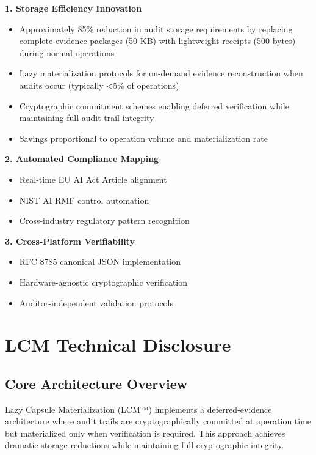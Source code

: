 \documentclass[12pt,a4paper]{article}
\begin{document}
\begin{valuebox}
\textbf{1. Storage Efficiency Innovation}
\begin{itemize}
\item Approximately 85\% reduction in audit storage requirements by replacing complete evidence packages (50 KB) with lightweight receipts (500 bytes) during normal operations
\item Lazy materialization protocols for on-demand evidence reconstruction when audits occur (typically <5\% of operations)
\item Cryptographic commitment schemes enabling deferred verification while maintaining full audit trail integrity
\item Savings proportional to operation volume and materialization rate
\end{itemize}

\textbf{2. Automated Compliance Mapping}
\begin{itemize}
\item Real-time EU AI Act Article alignment
\item NIST AI RMF control automation
\item Cross-industry regulatory pattern recognition
\end{itemize}

\textbf{3. Cross-Platform Verifiability}
\begin{itemize}
\item RFC 8785 canonical JSON implementation
\item Hardware-agnostic cryptographic verification
\item Auditor-independent validation protocols
\end{itemize}
\end{valuebox}

\section{LCM Technical Disclosure}

\subsection{Core Architecture Overview}

Lazy Capsule Materialization (LCM™) implements a deferred-evidence architecture where audit trails are cryptographically committed at operation time but materialized only when verification is required. This approach achieves dramatic storage reductions while maintaining full cryptographic integrity.
\end{document}
